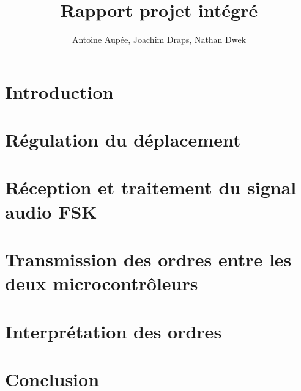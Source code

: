 \documentclass[a4paper, 11pt, frenchb]{report}
\title{Rapport projet intégré}
\author{Antoine Aupée, Joachim Draps, Nathan Dwek}
\begin{document}

\setcounter{page}{2}
\tableofcontents

\chapter{Introduction}


\chapter{Régulation du déplacement\label{chap:regul}}


\chapter{Réception et traitement du signal audio FSK\label{chap:audio}}


\chapter{Transmission des ordres entre les deux microcontrôleurs\label{chap:uart}}


\chapter{Interprétation des ordres\label{chap:decision}}


\chapter{Conclusion\label{chap:conclusion}}


\listoffigures
\setcounter{page}{1}

\end{document}
